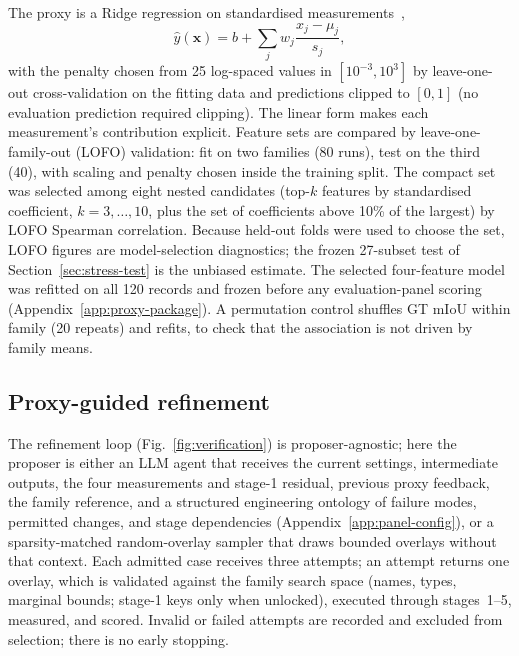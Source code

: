 \documentclass[a4paper,fleqn]{cas-dc}
\begin{document}
The proxy is a Ridge regression on standardised measurements~\cite{hoerl1970ridge,pedregosa2011sklearn},
\begin{equation}
\hat y(\mathbf x)=b+\sum_{j} w_j\frac{x_j-\mu_j}{s_j},
\label{eq:ridge-proxy}
\end{equation}
with the penalty chosen from 25 log-spaced values in $[10^{-3},10^{3}]$ by leave-one-out cross-validation on the fitting data and predictions clipped to $[0,1]$ (no evaluation prediction required clipping). The linear form makes each measurement's contribution explicit. Feature sets are compared by leave-one-family-out (LOFO) validation: fit on two families (80 runs), test on the third (40), with scaling and penalty chosen inside the training split. The compact set was selected among eight nested candidates (top-$k$ features by standardised coefficient, $k=3,\ldots,10$, plus the set of coefficients above 10\% of the largest) by LOFO Spearman correlation. Because held-out folds were used to choose the set, LOFO figures are model-selection diagnostics; the frozen 27-subset test of Section~\ref{sec:stress-test} is the unbiased estimate. The selected four-feature model was refitted on all 120 records and frozen before any evaluation-panel scoring (Appendix~\ref{app:proxy-package}). A permutation control shuffles GT mIoU within family (20 repeats) and refits, to check that the association is not driven by family means.

\subsection{Proxy-guided refinement}
\label{sec:agent-design}

The refinement loop (Fig.~\ref{fig:verification}) is proposer-agnostic; here the proposer is either an LLM agent that receives the current settings, intermediate outputs, the four measurements and stage-1 residual, previous proxy feedback, the family reference, and a structured engineering ontology of failure modes, permitted changes, and stage dependencies (Appendix~\ref{app:panel-config}), or a sparsity-matched random-overlay sampler that draws bounded overlays without that context. Each admitted case receives three attempts; an attempt returns one overlay, which is validated against the family search space (names, types, marginal bounds; stage-1 keys only when unlocked), executed through stages~1--5, measured, and scored. Invalid or failed attempts are recorded and excluded from selection; there is no early stopping.
\end{document}
